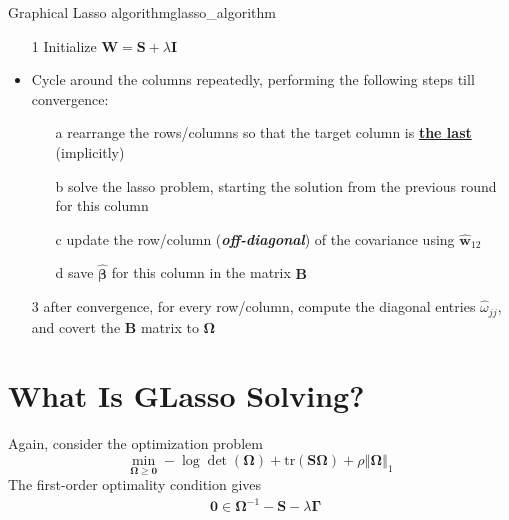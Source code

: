 \documentclass[twoside]{article}
\begin{document}
\begin{algorithm}{Graphical Lasso algorithm}{glasso_algorithm}
    \begin{itemize}
        \item[1] Initialize $\mathbf{W}= \mathbf{S} + \lambda\mathbf{I}$ 
        \item Cycle around the columns repeatedly, performing the following steps till convergence: 
        \begin{itemize}
            \item[a] rearrange the rows/columns so that the target column is \textbf{\underline{the last}} (implicitly)
            \item[b] solve the lasso problem, starting the solution from the previous round for this column
            \item[c] update the row/column (\textbf{\textit{off-diagonal}}) of the covariance using $\hat{\mathbf{w}}_{12}$
            \item[d] save $\hat{\boldsymbol{\beta}}$ for this column in the matrix $\mathbf{B}$
        \end{itemize}
        \item[3] after convergence, for every row/column, compute the diagonal entries $\hat{\omega}_{jj}$, and covert the $\mathbf{B}$ matrix to $\boldsymbol{\Omega}$
    \end{itemize}
\end{algorithm}

\section{What Is GLasso Solving?}
Again, consider the optimization problem 
\begin{equation*}
    \min_{\boldsymbol{\Omega}\geq \mathbf{0}} -\log \det (\boldsymbol{\Omega}) + \mathrm{tr}(\mathbf{S}\boldsymbol{\Omega}) +\rho\left\Vert \boldsymbol{\Omega} \right\Vert _1 
\end{equation*}
The first-order optimality condition gives
\begin{align*}
    &\mathbf{0} \in \boldsymbol{\Omega}^{-1} - \mathbf{S} -\lambda \boldsymbol{\Gamma}
\end{align*}
\end{document}
